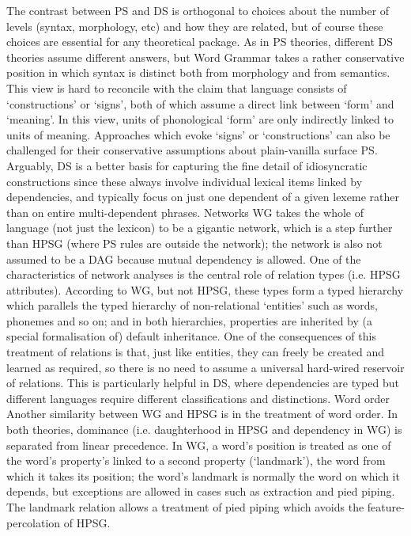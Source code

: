 \documentclass[output=paper]{langsci/langscibook}
\begin{document}
The contrast between PS and DS is orthogonal to choices about the number of levels (syntax,
morphology, etc) and how they are related, but of course these choices are essential for any
theoretical package. As in PS theories, different DS theories assume different answers, but Word
Grammar takes a rather conservative position in which syntax is distinct both from morphology and
from semantics. This view is hard to reconcile with the claim that language consists of
‘constructions’ or ‘signs’, both of which assume a direct link between ‘form’ and ‘meaning’. In this
view, units of phonological ‘form’ are only indirectly linked to units of meaning.  Approaches which
evoke ‘signs’ or ‘constructions’ can also be challenged for their conservative assumptions about
plain-vanilla surface PS. Arguably, DS is a better basis for capturing the fine detail of
idiosyncratic constructions since these always involve individual lexical items linked by
dependencies, and typically focus on just one dependent of a given lexeme rather than on entire
multi-dependent phrases.  Networks WG takes the whole of language (not just the lexicon) to be a
gigantic network, which is a step further than HPSG (where PS rules are outside the network); the
network is also not assumed to be a DAG because mutual dependency is allowed.  One of the
characteristics of network analyses is the central role of relation types (i.e. HPSG
attributes). According to WG, but not HPSG, these types form a typed hierarchy which parallels the
typed hierarchy of non-relational ‘entities’ such as words, phonemes and so on; and in both
hierarchies, properties are inherited by (a special formalisation of) default inheritance. One of
the consequences of this treatment of relations is that, just like entities, they can freely be
created and learned as required, so there is no need to assume a universal hard-wired reservoir of
relations. This is particularly helpful in DS, where dependencies are typed but different languages
require different classifications and distinctions.  Word order Another similarity between WG and
HPSG is in the treatment of word order. In both theories, dominance (i.e. daughterhood in HPSG and
dependency in WG) is separated from linear precedence. In WG, a word’s position is treated as one of
the word’s property’s linked to a second property (‘landmark’), the word from which it takes its
position; the word’s landmark is normally the word on which it depends, but exceptions are allowed
in cases such as extraction and pied piping. The landmark relation allows a treatment of pied piping
which avoids the feature-percolation of HPSG.
\end{document}
